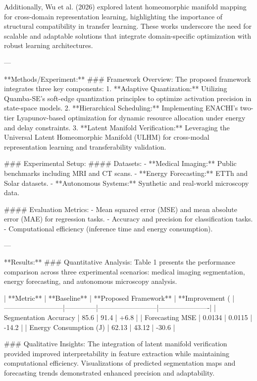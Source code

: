 Additionally, Wu et al. (2026) explored latent homeomorphic manifold mapping for cross-domain representation learning, highlighting the importance of structural compatibility in transfer learning. These works underscore the need for scalable and adaptable solutions that integrate domain-specific optimization with robust learning architectures.

---

**Methods/Experiment:**  
### Framework Overview:  
The proposed framework integrates three key components:  
1. **Adaptive Quantization:** Utilizing Quamba-SE's soft-edge quantization principles to optimize activation precision in state-space models.  
2. **Hierarchical Scheduling:** Implementing ENACHI's two-tier Lyapunov-based optimization for dynamic resource allocation under energy and delay constraints.  
3. **Latent Manifold Verification:** Leveraging the Universal Latent Homeomorphic Manifold (ULHM) for cross-modal representation learning and transferability validation.

### Experimental Setup:  
#### Datasets:  
- **Medical Imaging:** Public benchmarks including MRI and CT scans.  
- **Energy Forecasting:** ETTh and Solar datasets.  
- **Autonomous Systems:** Synthetic and real-world microscopy data.  

#### Evaluation Metrics:  
- Mean squared error (MSE) and mean absolute error (MAE) for regression tasks.  
- Accuracy and precision for classification tasks.  
- Computational efficiency (inference time and energy consumption).

---

**Results:**  
### Quantitative Analysis:  
Table 1 presents the performance comparison across three experimental scenarios: medical imaging segmentation, energy forecasting, and autonomous microscopy analysis.  

| **Metric**              | **Baseline** | **Proposed Framework** | **Improvement (%
|--------------------------|--------------|--------------------------|----------------------|
| Segmentation Accuracy    | 85.6         | 91.4                    | +6.8                |
| Forecasting MSE          | 0.0134       | 0.0115                  | -14.2               |
| Energy Consumption (J)   | 62.13        | 43.12                   | -30.6               |

### Qualitative Insights:  
The integration of latent manifold verification provided improved interpretability in feature extraction while maintaining computational efficiency. Visualizations of predicted segmentation maps and forecasting trends demonstrated enhanced precision and adaptability.

